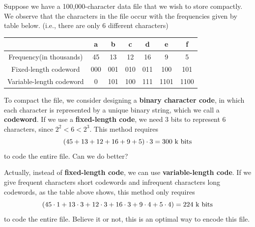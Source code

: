 \begin{spacing}{1.3}
    Suppose we have a 100,000-character data file that we wish to store compactly. 
    We observe that the characters in the file occur with the frequencies given by table below. 
    (i.e., there are only 6 different characters)
    \begin{center}
        \begin{tabular}{c|c|c|c|c|c|c}
            \hline
            & a & b & c & d & e & f\\\hline
            Frequency(in thousands) & 45 & 13 & 12 & 16 & 9 & 5\\
            Fixed-length codeword & 000 & 001 & 010 & 011 & 100 & 101\\
            Variable-length codeword & 0 & 101 & 100 & 111 & 1101 & 1100
        \end{tabular}
    \end{center}
    To compact the file, we consider designing a {\bf binary character code}, 
    in which each character is represented by a unique binary string, which we call a {\bf codeword}. 
    If we use a {\bf fixed-length code}, we need 3 bits to represent 6 characters, since $2^2 < 6 <2^3$. 
    This method requires 
    $$(45+13+12+16+9+5)\cdot 3=300\ {\rm k\ bits}$$
    to code the entire file. Can we do better?

    Actually, instead of {\bf fixed-length code}, we can use {\bf variable-length code}. 
    If we give frequent characters short codewords and infrequent characters long codewords,
    as the table above shows, this method only requires
    $$(45\cdot 1+13\cdot 3+12\cdot 3+16\cdot 3+9\cdot 4+5\cdot 4)=224\ {\rm k\ bits}$$
    to code the entire file. Believe it or not, this is an optimal way to encode this file.









    
    

\end{spacing}
